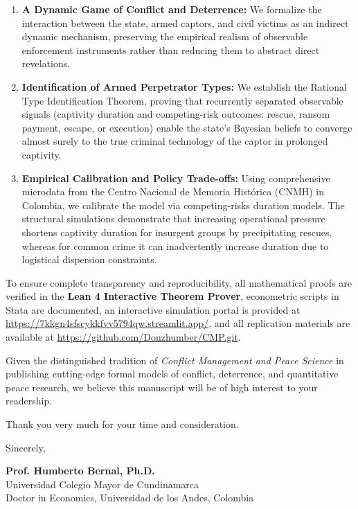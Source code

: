 \documentclass[12pt]{article}
\begin{document}
\begin{enumerate}
    \item \textbf{A Dynamic Game of Conflict and Deterrence:} We formalize the interaction between the state, armed captors, and civil victims as an indirect dynamic mechanism, preserving the empirical realism of observable enforcement instruments rather than reducing them to abstract direct revelations.
    
    \item \textbf{Identification of Armed Perpetrator Types:} We establish the Rational Type Identification Theorem, proving that recurrently separated observable signals (captivity duration and competing-risk outcomes: rescue, ransom payment, escape, or execution) enable the state's Bayesian beliefs to converge almost surely to the true criminal technology of the captor in prolonged captivity.
    
    \item \textbf{Empirical Calibration and Policy Trade-offs:} Using comprehensive microdata from the Centro Nacional de Memoria Histórica (CNMH) in Colombia, we calibrate the model via competing-risks duration models. The structural simulations demonstrate that increasing operational pressure shortens captivity duration for insurgent groups by precipitating rescues, whereas for common crime it can inadvertently increase duration due to logistical dispersion constraints.
\end{enumerate}

To ensure complete transparency and reproducibility, all mathematical proofs are verified in the \textbf{Lean 4 Interactive Theorem Prover}, econometric scripts in Stata are documented, an interactive simulation portal is provided at \url{https://7kkgn4sfscykkfvv5794qw.streamlit.app/}, and all replication materials are available at \url{https://github.com/Donzhumber/CMP.git}.

Given the distinguished tradition of \textit{Conflict Management and Peace Science} in publishing cutting-edge formal models of conflict, deterrence, and quantitative peace research, we believe this manuscript will be of high interest to your readership.

Thank you very much for your time and consideration.

\vspace{2.5em}

\begin{flushleft}
Sincerely,

\vspace{2.5em}

\textbf{Prof. Humberto Bernal, Ph.D.} \\
Universidad Colegio Mayor de Cundinamarca \\
Doctor in Economics, Universidad de los Andes, Colombia
\end{flushleft}
\end{document}
